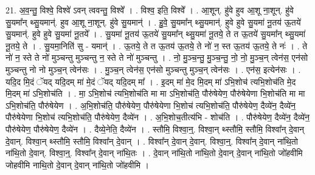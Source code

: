 \documentclass[17pt]{extarticle}
\begin{document}
21. अ॒व॒न्तु॒ विश्वे॒ विश्वे॑ ऽवन् त्ववन्तु॒ विश्वे᳚ । . विश्व॒ इति॒ विश्वे᳚ । . आ॒शून्. हु॑वे हुव आ॒शू ना॒शून्. हु॑वे सु॒यमा᳚न् थ्सु॒यमान्॑. हुव आ॒शू ना॒शून्. हु॑वे सु॒यमान्॑ । . हु॒वे॒ सु॒यमा᳚न् थ्सु॒यमान्॑. हुवे हुवे सु॒यमा॑ नू॒तय॑ ऊ॒तये॑ सु॒यमान्॑. हुवे हुवे सु॒यमा॑ नू॒तये᳚ । . सु॒यमा॑ नू॒तय॑ ऊ॒तये॑ सु॒यमा᳚न् थ्सु॒यमा॑ नू॒तये॒ ते त ऊ॒तये॑ सु॒यमा᳚न् थ्सु॒यमा॑ नू॒तये॒ ते । . सु॒यमा॒निति॑ सु - यमान्॑ । . ऊ॒तये॒ ते त ऊ॒तय॑ ऊ॒तये॒ ते नो॑ न॒ स्त ऊ॒तय॑ ऊ॒तये॒ ते नः॑ । . ते नो॑ न॒ स्ते ते नो॑ मुञ्चन्तु मुञ्चन्तु न॒ स्ते ते नो॑ मुञ्चन्तु । . नो॒ मु॒ञ्च॒न्तु॒ मु॒ञ्च॒न्तु॒ नो॒ नो॒ मु॒ञ्च॒न् त्वेन॑स॒ एन॑सो मुञ्चन्तु नो नो मुञ्च॒न् त्वेन॑सः । . मु॒ञ्च॒न् त्वेन॑स॒ एन॑सो मुञ्चन्तु मुञ्च॒न् त्वेन॑सः । . एन॑स॒ इत्येन॑सः । . यदि॒द मि॒दं ॅयद् यदि॒दम् मा॑ मे॒दं ॅयद् यदि॒दम् मा᳚ । . इ॒दम् मा॑ मे॒द मि॒दम् मा॑ ऽभि॒शोच॑ त्यभि॒शोच॑ति मे॒द मि॒दम् मा॑ ऽभि॒शोच॑ति । . मा॒ ऽभि॒शोच॑ त्यभि॒शोच॑ति मा मा ऽभि॒शोच॑ति॒ पौरु॑षेयेण॒ पौरु॑षेयेणा भि॒शोच॑ति मा मा ऽभि॒शोच॑ति॒ पौरु॑षेयेण । . अ॒भि॒शोच॑ति॒ पौरु॑षेयेण॒ पौरु॑षेयेणा भि॒शोच॑ त्यभि॒शोच॑ति॒ पौरु॑षेयेण॒ दैव्ये॑न॒ दैव्ये॑न॒ पौरु॑षेयेणा भि॒शोच॑ त्यभि॒शोच॑ति॒ पौरु॑षेयेण॒ दैव्ये॑न । . अ॒भि॒शोच॒तीत्य॑भि - शोच॑ति । . पौरु॑षेयेण॒ दैव्ये॑न॒ दैव्ये॑न॒ पौरु॑षेयेण॒ पौरु॑षेयेण॒ दैव्ये॑न । . दैव्ये॒नेति॒ दैव्ये॑न । . स्तौमि॒ विश्वा॒न्॒. विश्वा॒न् थ्स्तौमि॒ स्तौमि॒ विश्वा᳚न् दे॒वान् दे॒वान्. विश्वा॒न् थ्स्तौमि॒ स्तौमि॒ विश्वा᳚न् दे॒वान् । . विश्वा᳚न् दे॒वान् दे॒वान्. विश्वा॒न्॒. विश्वा᳚न् दे॒वान् ना॑थि॒तो ना॑थि॒तो दे॒वान्. विश्वा॒न्॒. विश्वा᳚न् दे॒वान् ना॑थि॒तः । . दे॒वान् ना॑थि॒तो ना॑थि॒तो दे॒वान् दे॒वान् ना॑थि॒तो जो॑हवीमि जोहवीमि नाथि॒तो दे॒वान् दे॒वान् ना॑थि॒तो जो॑हवीमि । \newline
\end{document}

